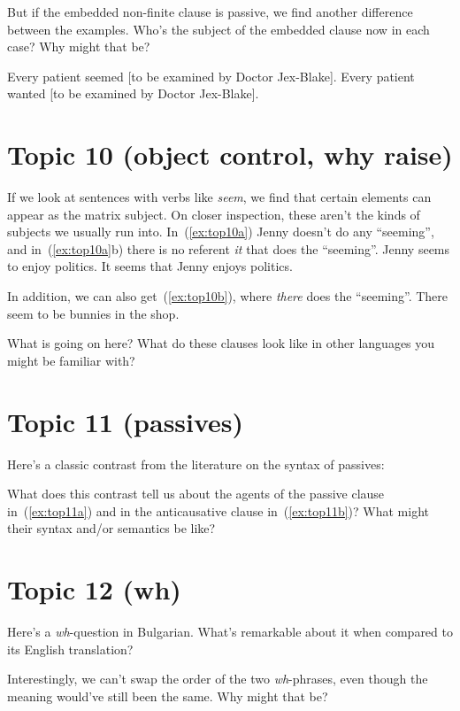 \documentclass{article}
\begin{document}
But if the embedded non-finite clause is passive, we find another difference between the examples. Who's the subject of the embedded clause now in each case? Why might that be?

\ea 
    \ea Every patient seemed [to be examined by Doctor Jex-Blake].
    \ex Every patient wanted [to be examined by Doctor Jex-Blake].
    \z
\z


\section{Topic 10 (object control, why raise)}
If we look at sentences with verbs like \emph{seem}, we find that certain elements can appear as the matrix subject. On closer inspection, these aren't the kinds of subjects we usually run into. In~(\ref{ex:top10a}) Jenny doesn't do any ``seeming'', and in~(\ref{ex:top10a}b) there is no referent \emph{it} that does the ``seeming''.
\ea \label{ex:top10a}
    \ea Jenny seems to enjoy politics.
    \ex It seems that Jenny enjoys politics.
    \z
\z

In addition, we can also get~(\ref{ex:top10b}), where \emph{there} does the ``seeming''.
\ea \label{ex:top10b} There seem to be bunnies in the shop.
\z

What is going on here? What do these clauses look like in other languages you might be familiar with?


\section{Topic 11 (passives)}
Here's a classic contrast from the literature on the syntax of passives:
\z
{}
\z

What does this contrast tell us about the agents of the passive clause in~(\ref{ex:top11a}) and in the anticausative clause in~(\ref{ex:top11b})? What might their syntax and/or semantics be like?


\section{Topic 12 (wh)}

Here's a \emph{wh}-question in Bulgarian. What's remarkable about it when compared to its English translation?
\z

Interestingly, we can't swap the order of the two \emph{wh}-phrases, even though the meaning would've still been the same. Why might that be?
\z
\end{document}
